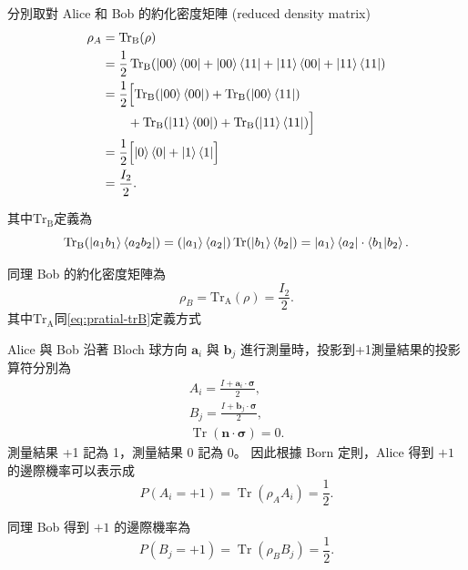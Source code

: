 \documentclass[12pt, a4paper, twoside, reqno]{article}
\begin{document}
\indent 分別取對 Alice 和 Bob 的約化密度矩陣 (reduced density matrix)
\begin{equation}
    \begin{aligned}
        \rho_A 
        &=\operatorname{Tr_B}(\rho)\\
        &=\frac{1}{2}\operatorname{Tr_B}(\ket{00}\bra{00}+\ket{00}\bra{11}+\ket{11}\bra{00}+\ket{11}\bra{11})\\
        &=\frac{1}{2}\Bigl[\operatorname{Tr_B}(\ket{00}\bra{00})+\operatorname{Tr_B}(\ket{00}\bra{11})\\
        &\qquad+\operatorname{Tr_B}(\ket{11}\bra{00})+\operatorname{Tr_B}(\ket{11}\bra{11}) \Bigr]\\
        &=\frac{1}{2}\Bigl[\ket{0}\bra{0}+\ket{1}\bra{1}\Bigr]\\
        &=\frac{I_2}{2}.
    \end{aligned}
    \label{eq:alice-reduce-density-rho}
\end{equation}

\noindent 其中$\operatorname{Tr_B}$定義為
\begin{equation}
    \operatorname{Tr_B}(\ket{a_1b_1}\bra{a_2b_2})=(\ket{a_1}\bra{a_2})\operatorname{Tr}(\ket{b_1}\bra{b_2})=\ket{a_1}\bra{a_2}\cdot\braket{b_1|b_2}.
    \label{eq:pratial-trB}
\end{equation}

\noindent 同理 Bob 的約化密度矩陣為
\[
    \rho_B = \operatorname{Tr_A}(\rho) = \frac{I_2}{2}.
    \label{eq:bob-reduce-density-rho}
\]
其中$\operatorname{Tr_A}$同\eqref{eq:pratial-trB}定義方式

\indent Alice 與 Bob 沿著 Bloch 球方向 $\bm{a}_i$ 與 $\bm{b}_j$ 進行測量時，投影到+1測量結果的投影算符分別為
\[
\begin{aligned}
    A_i=\frac{I+\bm{a}_i\cdot\bm{\sigma}}{2},
    \\
    B_j=\frac{I+\bm{b}_j\cdot\bm{\sigma}}{2},
    \\
    \operatorname{Tr}(\bm{n}\cdot\bm{\sigma})=0.
\end{aligned}
\]
測量結果 +1 記為 1，測量結果 0 記為 0。
\noindent 因此根據 Born 定則，Alice 得到 $+1$ 的邊際機率可以表示成
\begin{equation}
        P(A_i = +1) =\operatorname{Tr}(\rho_A A_i)=\frac{1}{2}.
    \label{eq:alice-+1-probability}
\end{equation}

\noindent 同理 Bob 得到 $+1$ 的邊際機率為
\[
    P(B_j=+1) = \operatorname{Tr}(\rho_B B_j) = \frac{1}{2}.
    \label{bob-+1}
\]
\end{document}
